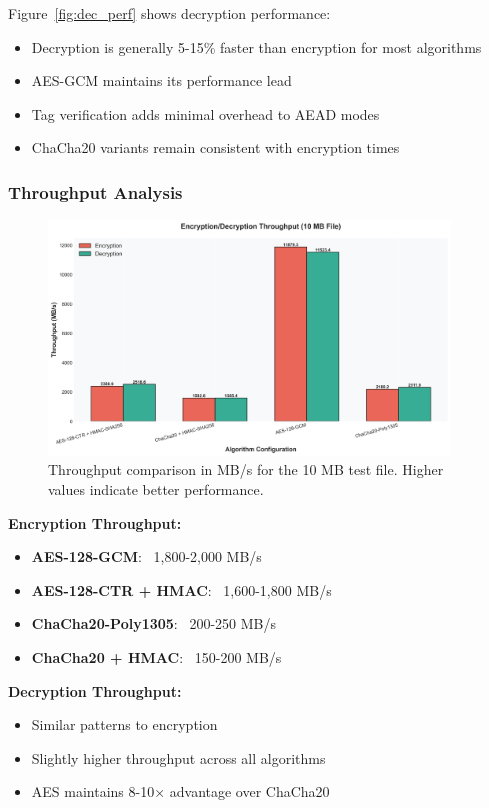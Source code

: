 \documentclass[12pt,a4paper]{article}
\begin{document}
Figure~\ref{fig:dec_perf} shows decryption performance:
\begin{itemize}
    \item Decryption is generally 5-15\% faster than encryption for most algorithms
    \item AES-GCM maintains its performance lead
    \item Tag verification adds minimal overhead to AEAD modes
    \item ChaCha20 variants remain consistent with encryption times
\end{itemize}

\subsubsection{Throughput Analysis}

\begin{figure}[h]
\centering
\includegraphics[width=0.95\textwidth]{throughput_comparison.png}
\caption{Throughput comparison in MB/s for the 10 MB test file. Higher values indicate better performance.}
\label{fig:throughput}
\end{figure}

\textbf{Encryption Throughput:}
\begin{itemize}
    \item \textbf{AES-128-GCM}: ~1,800-2,000 MB/s
    \item \textbf{AES-128-CTR + HMAC}: ~1,600-1,800 MB/s
    \item \textbf{ChaCha20-Poly1305}: ~200-250 MB/s
    \item \textbf{ChaCha20 + HMAC}: ~150-200 MB/s
\end{itemize}

\textbf{Decryption Throughput:}
\begin{itemize}
    \item Similar patterns to encryption
    \item Slightly higher throughput across all algorithms
    \item AES maintains 8-10× advantage over ChaCha20
\end{itemize}
\end{document}
